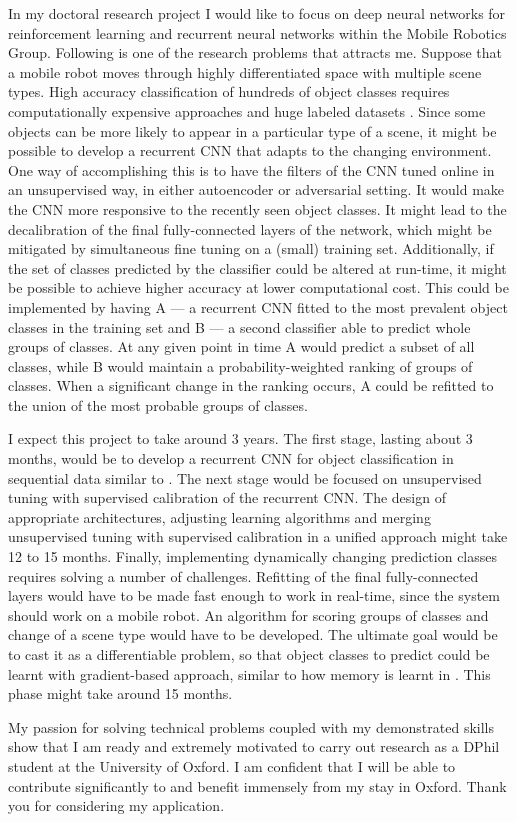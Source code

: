\documentclass[12pt]{article}
\begin{document}
In my doctoral research project I would like to focus on deep neural networks for reinforcement learning and recurrent neural networks within the Mobile Robotics Group. Following is one of the research problems that attracts me. Suppose that a mobile robot moves through highly differentiated space with multiple scene types. High accuracy classification of hundreds of object classes requires computationally expensive approaches and huge labeled datasets \cite{imagenet}. Since some objects can be more likely to appear in a particular type of a scene, it might be possible to develop a recurrent CNN that adapts to the changing environment. One way of accomplishing this is to have the filters of the CNN tuned online in an unsupervised way, in either autoencoder \cite{autoencoders} or adversarial \cite{adversarial} setting. It would make the CNN more responsive to the recently seen object classes. It might lead to the decalibration of the final fully-connected layers of the network, which might be mitigated by simultaneous fine tuning on a (small) training set. Additionally, if the set of classes predicted by the classifier could be altered at run-time, it might be possible to achieve higher accuracy at lower computational cost. This could be implemented by having A --- a recurrent CNN fitted to the most prevalent object classes in the training set and B --- a second classifier able to predict whole groups of classes. At any given point in time A would predict a subset of all classes, while B would maintain a probability-weighted ranking of groups of classes. When a significant change in the ranking occurs, A could be refitted to the union of the most probable groups of classes. 

I expect this project to take around 3 years. The first stage, lasting about 3 months, would be to develop a recurrent CNN for object classification in sequential data similar to \cite{rcnn}. The next stage would be focused on unsupervised tuning with supervised calibration of the recurrent CNN. The design of appropriate architectures, adjusting learning algorithms and merging unsupervised tuning with supervised calibration in a unified approach might take 12 to 15 months. Finally, implementing dynamically changing prediction classes requires solving a number of challenges. Refitting of the final fully-connected layers would have to be made fast enough to work in real-time, since the system should work on a mobile robot. An algorithm for scoring groups of classes and change of a scene type would have to be developed. The ultimate goal would be to cast it as a differentiable problem, so that object classes to predict could be learnt with gradient-based approach, similar to how memory is learnt in \cite{memory}. This phase might take around 15 months.


My passion for solving technical problems coupled with my demonstrated skills show that I am ready and extremely motivated to carry out research as a DPhil student at the University of Oxford. I am confident that I will be able to contribute significantly to and benefit immensely from my stay in Oxford. Thank you for considering my application.



\end{document}
